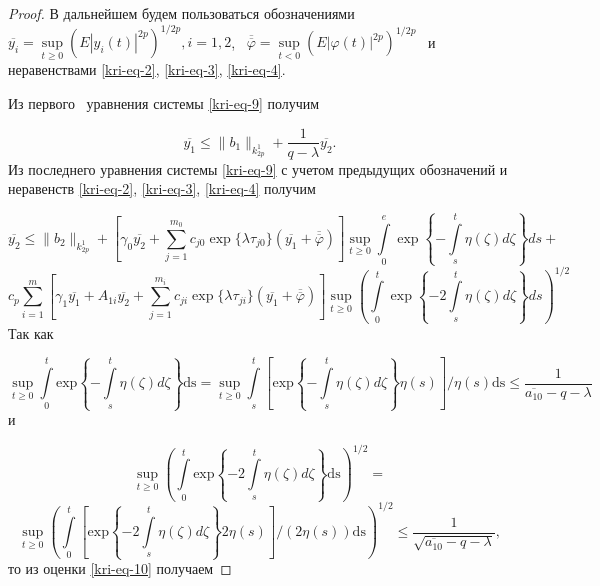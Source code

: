 \begin{proof}
В дальнейшем будем пользоваться обозначениями \  $\overline{y_i}=\sup\limits_{t\geq0} \left(E|y_i(t)|^{2p}\right)^{1/2p},i=1,2$, \  $\overline{\overline{\varphi
}}=\sup\limits_{t<0} \left(E|\varphi (t)|^{2p}\right)^{1/2p}$ \ и неравенствами \eqref{kri-eq-2}, \eqref{kri-eq-3}, \eqref{kri-eq-4}.

Из первого \ уравнения системы \eqref{kri-eq-9} получим

\begin{equation*}
\overline{y_1}\le \|b_1\|_{k_{2p}^1}+\frac 1{q-\lambda }\overline{y_2}.
\end{equation*}
Из последнего уравнения системы \eqref{kri-eq-9} с учетом предыдущих обозначений и неравенств \eqref{kri-eq-2}, \eqref{kri-eq-3}, \eqref{kri-eq-4} получим

\begin{equation*}
  \overline{y_2} \leq \|b_2\|_{k_{2p}^1} + \left[ \gamma_0 \overline{y_2} + \sum\limits_{j=1}^{m_0} c_{j0} \exp\{\lambda\tau_{j0}\}(\overline{y_1}+\overline{\overline{\varphi}}) \right]
\sup\limits_{t\geq0} \int\limits_{0}^{e} \exp\left\{-\int\limits_{s}^{t} \eta(\zeta)d\zeta\right\}ds +
\end{equation*}
\begin{equation}\label{kri-eq-10}
c_p \sum\limits_{i=1}^{m} \left[\gamma_1\overline{y_1}+A_{1i}\overline{y_2}+\sum\limits_{j=1}^{m_i} c_{ji}\exp \{\lambda\tau_{ji}\}(\overline{y_1}+\overline{\overline{\varphi}})\right]
\sup\limits_{t\geq0} \left(\int\limits_{0}^{t}\exp\left\{ -2\int\limits_{s}^{t} \eta(\zeta)d\zeta \right\} ds \right)^{1/2}
\end{equation}
%
Так как

\begin{equation*}
\sup\limits_{t\ge 0}\int\limits_{0}^{t}\text{exp}\left\{-\int\limits_{s}^{t}\eta (\zeta )\mathit{d\zeta }\right\}\text{ds}=\sup\limits_{t\geq 0} \int\limits_{s}^{t}
\left[\text{exp}\left\{-\int\limits_{s}^{t}\eta (\zeta
)\mathit{d\zeta }\right\}\eta (s)\right]/\eta (s)\text{ds}\le \frac 1{\overline{a_{10}}-q-\lambda }
\end{equation*}
и

\begin{equation*}
\sup\limits_{t\ge 0}\left(\int\limits_{0}^{t}\text{exp}\left\{-2\int\limits_{s}^{t}\eta (\zeta )\mathit{d\zeta
}\right\}\text{ds}\right)^{1/2}=
\end{equation*}
\begin{equation*}
\sup\limits_{t\ge 0}\left(\int\limits_{0}^{t}\left[\text{exp}\left\{-2\int\limits_{s}^{t}\eta (\zeta )\mathit{d\zeta }\right\}2\eta
(s)\right]/(2\eta (s))\text{ds}\right)^{1/2}\le \frac 1{\sqrt{\overline{a_{10}}-q-\lambda
}},
\end{equation*}
то из оценки \eqref{kri-eq-10} получаем


\end{proof}
